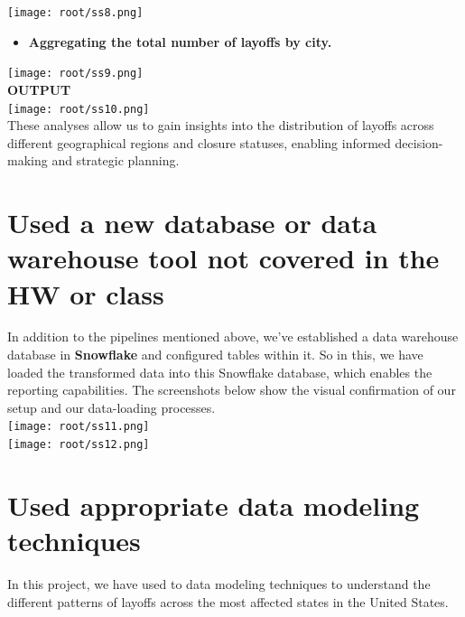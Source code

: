 \texttt{[image: root/ss8.png]}~\\\vspace*{-1cm}

\begin{itemize}
    \item \textbf{Aggregating the total number of layoffs by city.}

\end{itemize}

\texttt{[image: root/ss9.png]}~\\\vspace*{-1cm}
\textbf{{OUTPUT}}\\

\texttt{[image: root/ss10.png]}~\\
{These analyses allow us to gain insights into the distribution of layoffs across different geographical regions and closure statuses, enabling informed decision-making and strategic planning.}


\section{\Large\textbf{Used a new database or data warehouse tool not covered in the HW or class}}
{In addition to the pipelines mentioned above, we've established a data warehouse database in\textbf{ Snowflake} and configured tables within it. So in this, we have loaded the transformed data into this Snowflake database, which enables the reporting capabilities. The screenshots below show the visual confirmation of our setup and our data-loading processes.
}\\
\texttt{[image: root/ss11.png]}~\\[1cm]
\texttt{[image: root/ss12.png]}~\\

\section{\Large\textbf{Used appropriate data modeling techniques
}}
{In this project, we have used to data modeling techniques to understand the different patterns of layoffs across the most affected states in the United States.}\\

